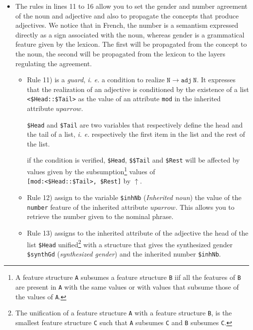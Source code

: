 \documentclass[11pt]{article}
\begin{document}
\begin{itemize}
\item The rules in lines 11 to 16 allow you to set the gender and
  number agreement of the noun and adjective and also to propagate the
  concepts that produce adjectives. We notice that in French, the
  number is a semantism expressed directly as a sign associated with
  the noun, whereas gender is a grammatical feature given by the
  lexicon. The first will be propagated from the concept to the noun,
  the second will be propagated from the lexicon to the layers
  regulating the agreement.
  

\begin{itemize}
  \item Rule 11) is a \textit{guard}, \textit{i. e.} a
    condition to realize
    $\mathtt{N} \rightarrow \mathtt{adj}~ \mathtt{N}$. It expresses that the
    realization of an adjective is conditioned by
    the existence of a list
    \verb#<$Head::$Tail># as the value of an attribute \texttt{mod}
    in the inherited attribute $uparrow$.
    
    \verb#$Head# and
    \verb#$Tail# are two variables that respectively define the
    head and the tail of a list, \textit{i. e.} respectively the
    first item in the list and the rest of the list.
    
    if the condition is verified, 
    \verb#$Head#, \verb#$$Tail# and
    \verb#$Rest# will be affected by values given by the
    subsumption\footnote{A feature structure \texttt{A} subsumes
      a feature structure \texttt{B} iif all the features of
      \texttt{B} are present in \texttt{A} with the same values
      or with values that subsume those of the
      values of \texttt{A}. } values of \\\verb#[mod:<$Head::$Tail>, $Rest]#
    by $\uparrow$.
    
  \item Rule 12) assign to the variable
    \verb#$inhNb# (\textit{Inherited noun}) the value of the
    \texttt{number} feature of the inherited attribute
    $uparrow$. This allows you to retrieve the number given to the
    nominal phrase.
    
  \item Rule 13) assigns to the inherited attribute of the adjective
    the head of the list \verb#$Head# unified\footnote{The unification
      of a feature structure \texttt{A} with a feature structure
      \texttt{B}, is the smallest feature structure \texttt{C} such
      that \texttt{A} subsumes \texttt{C} and \texttt{B} subsumes
      \texttt{C}.} with a structure that gives the synthesized gender
    \verb#$synthGd# (\textit{synthesized gender}) and the inherited
    number \verb#$inhNb#.
    

\end{itemize}
\end{itemize}
\end{document}
